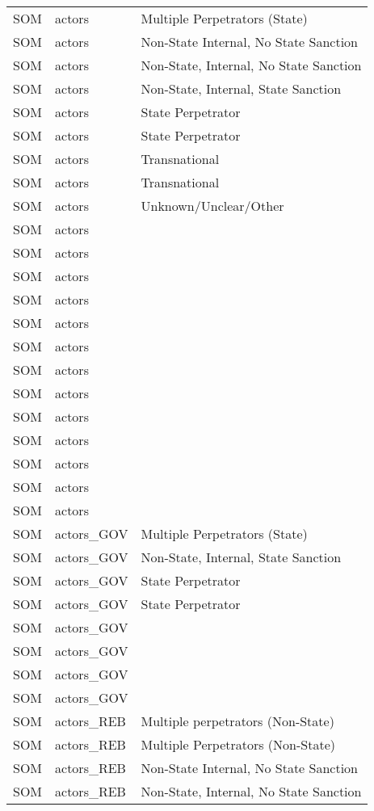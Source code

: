 \begin{table}[ht]
\begin{tabular}{lll}
  SOM & actors & Multiple Perpetrators (State) \\ 
  SOM & actors & Non-State Internal, No State Sanction \\ 
  SOM & actors & Non-State, Internal, No State Sanction \\ 
  SOM & actors & Non-State, Internal, State Sanction \\ 
  SOM & actors & State Perpetrator \\ 
  SOM & actors & State Perpetrator \\ 
  SOM & actors & Transnational \\ 
  SOM & actors & Transnational \\ 
  SOM & actors & Unknown/Unclear/Other \\ 
  SOM & actors &  \\ 
  SOM & actors &  \\ 
  SOM & actors &  \\ 
  SOM & actors &  \\ 
  SOM & actors &  \\ 
  SOM & actors &  \\ 
  SOM & actors &  \\ 
  SOM & actors &  \\ 
  SOM & actors &  \\ 
  SOM & actors &  \\ 
  SOM & actors &  \\ 
  SOM & actors &  \\ 
  SOM & actors &  \\ 
  SOM & actors\_GOV & Multiple Perpetrators (State) \\ 
  SOM & actors\_GOV & Non-State, Internal, State Sanction \\ 
  SOM & actors\_GOV & State Perpetrator \\ 
  SOM & actors\_GOV & State Perpetrator \\ 
  SOM & actors\_GOV &  \\ 
  SOM & actors\_GOV &  \\ 
  SOM & actors\_GOV &  \\ 
  SOM & actors\_GOV &  \\ 
  SOM & actors\_REB & Multiple perpetrators (Non-State) \\ 
  SOM & actors\_REB & Multiple Perpetrators (Non-State) \\ 
  SOM & actors\_REB & Non-State Internal, No State Sanction \\ 
  SOM & actors\_REB & Non-State, Internal, No State Sanction \\ 

\end{tabular}
\end{table}
